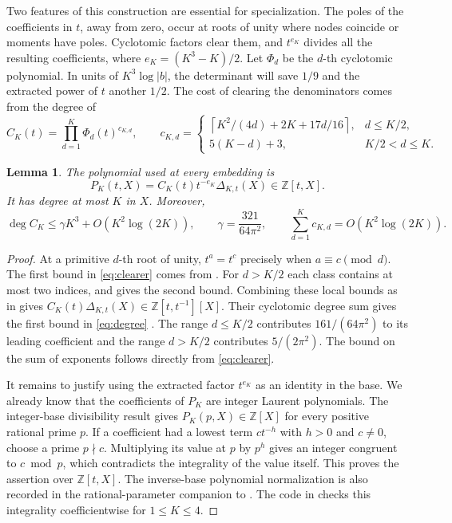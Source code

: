 \documentclass[11pt,letterpaper]{article}
\newtheorem{lemma}[theorem]{Lemma}
\numberwithin{equation}{section}
\newcommand{\Z}{\mathbb Z}
\begin{document}
Two features of this construction are essential for specialization.
The poles of the coefficients in \(t\), away from zero, occur at
roots of unity where nodes coincide or moments have poles.
Cyclotomic factors clear them, and \(t^{e_K}\) divides all the
resulting coefficients, where \(e_K=(K^3-K)/2\).
Let \(\Phi_d\) be the \(d\)-th cyclotomic
polynomial. In units of \(K^3\log|b|\), the determinant will save
\(1/9\) and the extracted power of \(t\) another \(1/2\).
The cost of clearing the denominators comes from the degree of
\begin{equation}\label{eq:clearer}
 C_K(t)=\prod_{d=1}^K \Phi_d(t)^{c_{K,d}},\qquad
 c_{K,d}=
 \begin{cases}
  \left\lceil K^2/(4d)+2K+17d/16\right\rceil,& d\le K/2,\\
  5(K-d)+3,& K/2<d\le K .
 \end{cases}
\end{equation}

\begin{lemma}\label{lem:arithmetic}
The polynomial used at every embedding is
\[
             P_K(t,X)=C_K(t)t^{-e_K}\Delta_{K,t}(X)\in\Z[t,X].
\]
It has degree at most \(K\) in \(X\). Moreover,
\begin{equation}\label{eq:degree}
 \deg C_K\le\gamma K^3+O(K^2\log(2K)),\qquad
 \gamma=\frac{321}{64\pi^2},\qquad
 \sum_{d=1}^K c_{K,d}=O(K^2\log(2K)).
\end{equation}
\end{lemma}

\begin{proof}
At a primitive \(d\)-th root of unity, \(t^a=t^c\) precisely when
\(a\equiv c\pmod d\). The first bound in \eqref{eq:clearer} comes
from \cite[\S4.2, (4.8)]{Uplift}. For \(d>K/2\) each class contains
at most two indices, and \cite[Proposition~A.1]{Uplift} gives the
second bound. Combining these local bounds as in \cite[\S4.4]{Uplift} gives
\(C_K(t)\Delta_{K,t}(X)\in\Z[t,t^{-1}][X]\).
Their cyclotomic degree sum gives the first bound in \eqref{eq:degree}
\cite[\S4.5 and Proposition~A.1]{Uplift}. The range \(d\le K/2\)
contributes \(161/(64\pi^2)\) to its leading coefficient and the
range \(d>K/2\) contributes \(5/(2\pi^2)\). The bound on the sum of
exponents follows directly from \eqref{eq:clearer}.

It remains to justify using the extracted factor \(t^{e_K}\) as an
identity in the base. We already know that the coefficients of \(P_K\)
are integer Laurent polynomials. The integer-base divisibility result
\cite[Proposition~3.1 and Appendix~A]{Uplift} gives
\(P_K(p,X)\in\Z[X]\) for every positive rational prime \(p\).
If a coefficient had a lowest term \(c t^{-h}\) with \(h>0\) and
\(c\ne0\), choose a prime \(p\nmid c\). Multiplying its value at
\(p\) by \(p^h\) gives an integer congruent to \(c\bmod p\), which
contradicts the integrality of the value itself. This proves the
assertion over \(\Z[t,X]\). The inverse-base polynomial normalization
is also recorded in the rational-parameter companion to
\cite[\S7.1]{Uplift}. The code in \cite{code} checks this integrality
coefficientwise for \(1\le K\le4\).
\end{proof}
\end{document}
